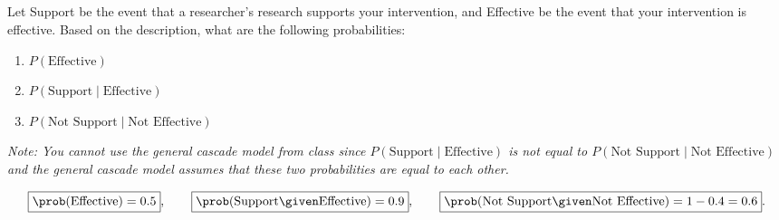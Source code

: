 \documentclass[newpages]{assignment}
\begin{document}
\subsection{}
\begin{problem}
    Let Support be the event that a researcher’s research supports your intervention, and Effective be the event that your intervention is effective. Based on the description, what are the following probabilities:
    \begin{enumerate}[label=\roman*.]
        \item $P(\text{Effective})$
        \item $P(\text{Support}\mid\text{Effective})$
        \item $P(\text{Not Support}\mid\text{Not Effective})$
    \end{enumerate}

    \emph{Note: You cannot use the general cascade model from class since $P(\text{Support}\mid\text{Effective})$ is not equal to $P(\text{Not Support}\mid\text{Not Effective})$ and the general cascade model assumes that these two probabilities are equal to each other.}
\end{problem}
\begin{solution}
    \[
        \boxed{\prob(\text{Effective})=0.5},\qquad
        \boxed{\prob(\text{Support}\given\text{Effective})=0.9},\qquad
        \boxed{\prob(\text{Not Support}\given\text{Not Effective})=1-0.4=0.6}.
    \]
\end{solution}
\end{document}
